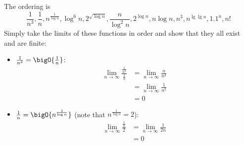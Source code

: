 \documentclass[final]{article}
\begin{document}
\begin{solution}
    The ordering is
    \[\frac{1}{n^3}, \frac{1}{n}, n^{\frac{1}{\log{n}}}, \log^6{n}, 2^{\sqrt{\log{n}}}, \frac{n}{\log^2{n}}, 2^{\log{n}}, n\log{n}, n^3, n^{\lg\lg{n}}, 1.1^n, n!\]
    Simply take the limits of these functions in order and show that they all exist and are finite:
    \begin{itemize}
        \item \(\frac{1}{n^3} = \bigO{\frac{1}{n}}\):
              \begin{align*}\lim_{n\to\infty}\frac{\frac{1}{n^3}}{\frac{1}{n}}
                   & = \lim_{n\to\infty}\frac{n}{n^3} \\
                   & = \lim_{n\to\infty}\frac{1}{n^2} \\
                   & = 0
              \end{align*}
        \item \(\frac{1}{n} = \bigO{n^{\frac{1}{\log{n}}}}\) (note that \(n^{\frac{1}{\log{n}}} = 2\)):
              \begin{align*}\lim_{n\to\infty}\frac{\frac{1}{n}}{2}
                   & = \lim_{n\to\infty}\frac{1}{2n} \\
                   & = 0
              \end{align*}


\end{itemize}
\end{solution}
\end{document}
